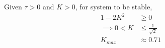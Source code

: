 \documentclass[journal,12pt,twocolumn]{IEEEtran}
\theoremstyle{remark}
\begin{document}
\begin{table}[htbp]
\setlength{\extrarowheight}{8pt}
\centering

\caption{}
\label{tab:inputs.IN.24.2023}
\end{table}


Given $\tau>0$ and $K>0$, for system to be stable,
\begin{align}
1-2K^2&\geq 0\\
\implies 0 < K&\leq \frac{1}{\sqrt{2}}\\
K_{max} &\approx 0.71
\end{align}
\end{document}
